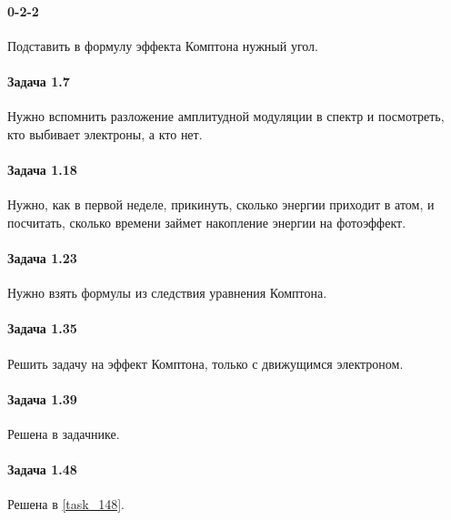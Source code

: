 \documentclass[12pt]{article}
\begin{document}
\paragraph{0-2-2} Подставить в формулу эффекта Комптона нужный угол.
\paragraph{Задача 1.7} Нужно вспомнить разложение амплитудной модуляции в спектр и посмотреть, кто выбивает электроны, а кто нет.
\paragraph{Задача 1.18} Нужно, как в первой неделе, прикинуть, сколько энергии приходит в атом, и посчитать, сколько времени займет накопление энергии на фотоэффект.
\paragraph{Задача 1.23} Нужно взять формулы из следствия уравнения Комптона.
\paragraph{Задача 1.35} Решить задачу на эффект Комптона, только с движущимся электроном.
\paragraph{Задача 1.39} Решена в задачнике.
\paragraph{Задача 1.48} Решена в \ref{task_148}.
\end{document}
